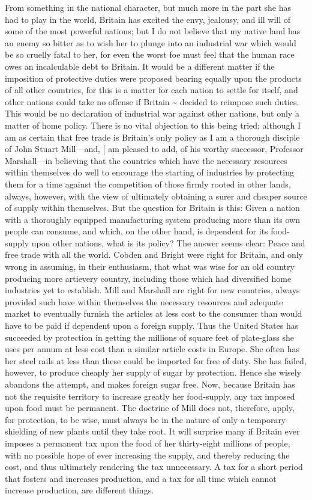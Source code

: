 \documentclass[11pt,openany]{book}
\begin{document}
From something in the national character, but much more in the part she has had to play in the world, Britain has excited the envy, jealousy, and ill will of some of the most powerful nations; but I do not believe that my native land has an enemy so bitter as to wish her to plunge into an industrial war which would be so cruelly fatal to her, for even the worst foe must feel that the human race owes an incalculable debt to Britain. It would be a different matter if the imposition of protective duties were proposed bearing equally upon the products of all other countries, for this is a matter for each nation to settle for itself, and other nations could take no offense if Britain \textasciitilde{} decided to reimpose such duties. This would be no declaration of industrial war against other nations, but only a matter of home policy. There is no vital objection to this being tried; although I am as certain that free trade is Britain's only policy as I am a thorough disciple of John Stuart Mill---and, [ am pleased to add, of his worthy successor, Professor Marshall---in believing that the countries which have the necessary resources within themselves do well to encourage the starting of industries by protecting them for a time against the competition of those firmly rooted in other lands, always, however, with the view of ultimately obtaining a surer and cheaper source of supply within themselves. But the question for Britain is this: Given a nation with a thoroughly equipped manufacturing system producing more than its own people can consume, and which, on the other hand, is dependent for its food-supply upon other nations, what is its policy? The answer seems clear: Peace and free trade with all the world. Cobden and Bright were right for Britain, and only wrong in assuming, in their enthusiasm, that what was wise for an old country producing more artievery country, including those which had diversified home industries yet to establish. Mill and Marshall are right for new countries, always provided such have within themselves the necessary resources and adequate market to eventually furnish the articles at less cost to the consumer than would have to be paid if dependent upon a foreign supply. Thus the United States has succeeded by protection in getting the millions of square feet of plate-glass she uses per annum at less cost than a similar article costs in Europe. She often has her steel rails at less than these could be imported for free of duty. She has failed, however, to produce cheaply her supply of sugar by protection. Hence she wisely abandons the attempt, and makes foreign sugar free. Now, because Britain has not the requisite territory to increase greatly her food-supply, any tax imposed upon food must be permanent. The doctrine of Mill does not, therefore, apply, for protection, to be wise, must always be in the nature of only a temporary shielding of new plants until they take root. It will surprise many if Britain ever imposes a permanent tax upon the food of her thirty-eight millions of people, with no possible hope of ever increasing the supply, and thereby reducing the cost, and thus ultimately rendering the tax unnecessary. A tax for a short period that fosters and increases production, and a tax for all time which cannot increase production, are different things.
\end{document}
